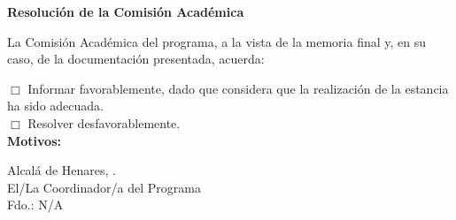\documentclass[11pt,a4paper,oneside]{article}
\newcommand{\PhDFormSection}[1]{%
  \vspace{0.45cm}\noindent\textbf{\large #1}\par\smallskip}
\newcommand{\PhDNA}{N/A}
\begin{document}
\newpage
\PhDFormSection{Resolución de la Comisión Académica}
La Comisión Académica del programa, a la vista de la memoria final y, en su caso, de la documentación presentada, acuerda:\par
\smallskip
$\Box$ Informar favorablemente, dado que considera que la realización de la estancia ha sido adecuada.\\[0.3cm]
$\Box$ Resolver desfavorablemente.\\[0.5cm]
\textbf{Motivos:}\par\vspace{4cm}
\begin{flushright}
Alcalá de Henares, \myPaperworkDate.\\[1.5cm]
El/La Coordinador/a del Programa\\
Fdo.: \PhDNA
\end{flushright}
\end{document}
